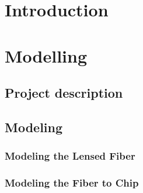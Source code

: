 
\chapter{Introduction}


%
%
%
%
%
%

\chapter{Modelling}

\newpage
\section{Project description}

\newpage
\section{Modeling}
\subsection{Modeling the Lensed Fiber}

\subsection{Modeling the Fiber to Chip}




